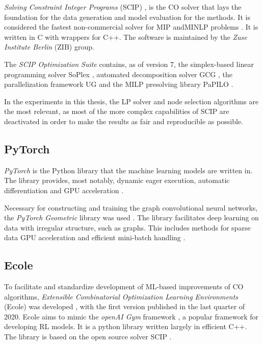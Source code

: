 \textit{Solving Constraint Integer Programs }(\gls{SCIP})
\cite{achterberg2009scip}, is the \gls{CO} solver that lays the foundation for the data generation and model evaluation for the methods. It is considered the fastest non-commercial solver for \gls{MIP} and\gls{MINLP} problems \cite{gamrath2020scip}. It is written in C with wrappers for C++. The software is maintained by the\textit{ Zuse Institute Berlin} (ZIB) group. 

The \textit{SCIP Optimization Suite} contains, as of version 7, the simplex-based linear programming solver SoPlex \cite{wunderling1996soplex}, automated decomposition solver GCG \cite{gamrath2010gcg}, the parallelization framework UG \cite{shinano2018ug} and the \gls{MILP} presolving library PaPILO \cite{gamrath2020scip}.

In the experiments in this thesis, the LP solver and node selection algorithms are the most relevant, as most of the more complex capabilities of \gls{SCIP} are deactivated in order to make the results as fair and reproducible as possible. 





\subsection{PyTorch}

\textit{PyTorch} is the Python library that the machine learning models are written in. The library provides, most notably, dynamic eager execution, automatic differentiation and \gls{GPU} acceleration \cite{paszke2019pytorch}. 

Necessary for constructing and training the graph convolutional neural networks, the \textit{PyTorch Geometric} library was used \cite{fey2019pytorchgeometric}. The library facilitates deep learning on data with irregular structure, such as graphs. This includes methods for sparse data GPU acceleration and efficient mini-batch handling \cite{fey2019pytorchgeometric}. 




\subsection{Ecole}\label{ssec:ecole}

To facilitate and standardize development of \gls{ML}-based improvements of \gls{CO} algorithms, \textit{Extensible Combinatorial Optimization Learning Environments} (\gls{Ecole}) was developed \cite{prouvost2020ecole}, with the first version published in the last quarter of 2020. \gls{Ecole} aims to mimic the \textit{openAI Gym} framework \cite{brockman2016openai}, a popular framework for developing \gls{RL} models. It is a python library written largely in efficient C++. 
The library is based on the open source solver \gls{SCIP} \cite{achterberg2009scip}.

